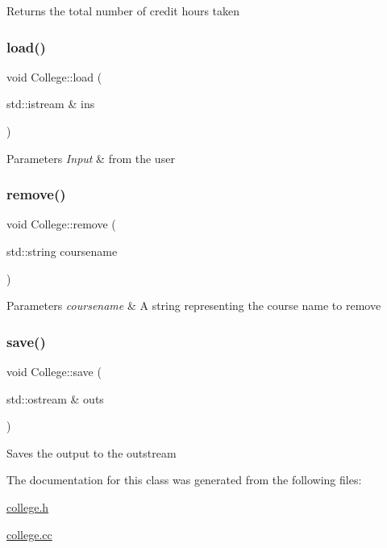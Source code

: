 Returns the total number of credit hours taken \mbox{\label{class_college_a11422094ddd907705daede7aa537dd73}} 
\subsubsection{\texorpdfstring{load()}{load()}}
{\footnotesize\ttfamily void College\+::load (\begin{DoxyParamCaption}\item[{std\+::istream \&}]{ins }\end{DoxyParamCaption})}


\begin{DoxyParams}{Parameters}
{\em Input} & from the user \\
\hline
\end{DoxyParams}
\mbox{\label{class_college_a4d2ae513b36e6421fb1ca2c08459cfe6}} 
\subsubsection{\texorpdfstring{remove()}{remove()}}
{\footnotesize\ttfamily void College\+::remove (\begin{DoxyParamCaption}\item[{std\+::string}]{coursename }\end{DoxyParamCaption})}


\begin{DoxyParams}{Parameters}
{\em coursename} & A string representing the course name to remove \\
\hline
\end{DoxyParams}
\mbox{\label{class_college_af6b419f813bc990c0e11f99b78a26899}} 
\subsubsection{\texorpdfstring{save()}{save()}}
{\footnotesize\ttfamily void College\+::save (\begin{DoxyParamCaption}\item[{std\+::ostream \&}]{outs }\end{DoxyParamCaption})}

Saves the output to the outstream 

The documentation for this class was generated from the following files\+:\begin{DoxyCompactItemize}
\item 
\hyperlink{college_8h}{college.\+h}\item 
\hyperlink{college_8cc}{college.\+cc}\end{DoxyCompactItemize}
